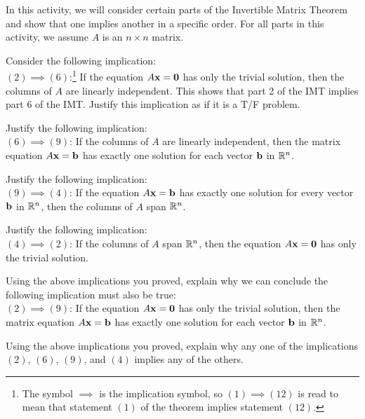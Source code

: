 \begin{activity} \label{act:2_d_1} In this activity, we will consider certain parts of the Invertible Matrix Theorem and show that one implies another in a specific order. For all parts in this activity, we assume $A$ is an $n\times n$ matrix.

\ba
\item Consider the following implication: \\
$(2) \implies (6)$:\footnote{The symbol $\implies$ is the implication symbol, so $(1) \implies (12)$ is read to mean that statement $(1)$ of the theorem implies statement $(12)$.}  If the equation $A \mathbf{x} = \mathbf{0}$ has only the trivial solution, then the columns of $A$ are linearly independent. This shows that part 2 of the IMT implies part 6 of the IMT. Justify this implication as if it is a T/F problem.

\item Justify the following implication:\\
$(6) \implies (9)$: If the columns of $A$ are linearly independent, then the matrix equation $A\mathbf{x} =\mathbf{b}$ has exactly one solution for each vector $\mathbf{b}$ in $\mathbb{R}^n$.

\item Justify the following implication:\\
$(9) \implies (4)$: If the equation $A \mathbf{x} = \mathbf{b}$ has exactly one solution for every vector $\mathbf{b}$ in $\mathbb{R}^n$, then the columns of $A$ span $\mathbb{R}^n$. \\

\item Justify the following implication:\\
$(4) \implies (2)$: If the columns of $A$ span $\mathbb{R}^n$, then the equation $A \mathbf{x} = \mathbf{0}$ has only the trivial solution.\\

\item Using the above implications you proved, explain why we can conclude the following implication must also be true:\\
$(2) \implies (9)$: If the equation $A \mathbf{x} = \mathbf{0}$ has only the trivial solution, then the matrix equation $A\mathbf{x} =\mathbf{b}$ has exactly one solution for each vector $\mathbf{b}$ in $\mathbb{R}^n$.

\item Using the above implications you proved, explain why any one of the implications $(2)$, $(6)$, $(9)$, and $(4)$ implies any of the others.  

\ea

\end{activity}



